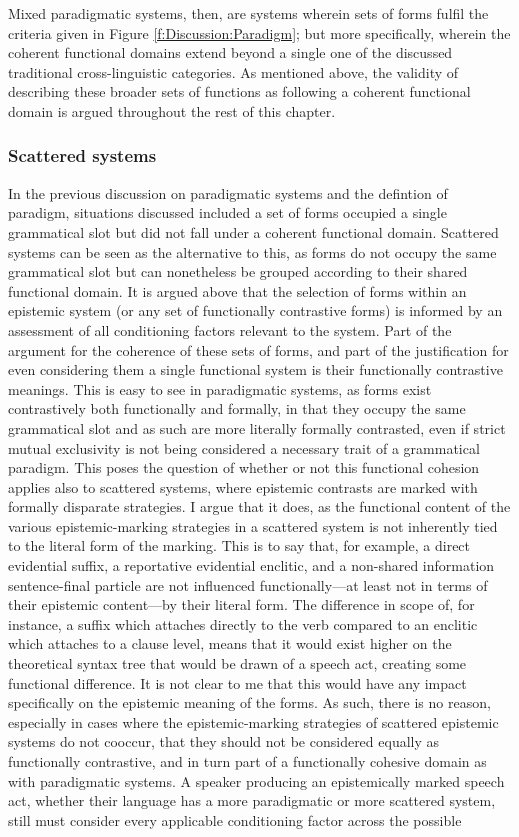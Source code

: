 Mixed paradigmatic systems, then, are systems wherein sets of forms fulfil the criteria given in Figure \ref{f:Discussion:Paradigm}; but more specifically, wherein the coherent functional domains extend beyond a single one of the discussed traditional cross-linguistic categories. As mentioned above, the validity of describing these broader sets of functions as following a coherent functional domain is argued throughout the rest of this chapter.

\subsubsection{Scattered systems}\label{sss:Discussion:Scattered}
In the previous discussion on paradigmatic systems and the defintion of paradigm, situations discussed included a set of forms occupied a single grammatical slot but did not fall under a coherent functional domain. Scattered systems can be seen as the alternative to this, as forms do not occupy the same grammatical slot but can nonetheless be grouped according to their shared functional domain. It is argued above that the selection of forms within an epistemic system (or any set of functionally contrastive forms) is informed by an assessment of all conditioning factors relevant to the system. Part of the argument for the coherence of these sets of forms, and part of the justification for even considering them a single functional system is their functionally contrastive meanings. This is easy to see in paradigmatic systems, as forms exist contrastively both functionally and formally, in that they occupy the same grammatical slot and as such are more literally formally contrasted, even if strict mutual exclusivity is not being considered a necessary trait of a grammatical paradigm. This poses the question of whether or not this functional cohesion applies also to scattered systems, where epistemic contrasts are marked with formally disparate strategies. I argue that it does, as the functional content of the various epistemic-marking strategies in a scattered system is not inherently tied to the literal form of the marking. This is to say that, for example, a direct evidential suffix, a reportative evidential enclitic, and a non-shared information sentence-final particle are not influenced functionally---at least not in terms of their epistemic content---by their literal form. The difference in scope of, for instance, a suffix which attaches directly to the verb compared to an enclitic which attaches to a clause level, means that it would exist higher on the theoretical syntax tree that would be drawn of a speech act, creating some functional difference. It is not clear to me that this would have any impact specifically on the epistemic meaning of the forms. As such, there is no reason, especially in cases where the epistemic-marking strategies of scattered epistemic systems do not cooccur, that they should not be considered equally as functionally contrastive, and in turn part of a functionally cohesive domain as with paradigmatic systems. A speaker producing an epistemically marked speech act, whether their language has a more paradigmatic or more scattered system, still must consider every applicable conditioning factor across the possible 